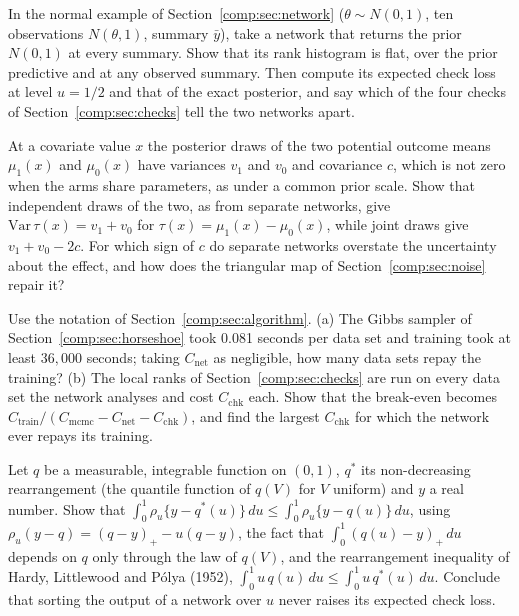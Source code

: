 \item\label{ex:chcomp:1} In the normal example of Section~\ref{comp:sec:network} ($\theta \sim N(0, 1)$, ten observations $N(\theta, 1)$, summary $\bar y$), take a network that returns the prior $N(0, 1)$ at every summary. Show that its rank histogram is flat, over the prior predictive and at any observed summary. Then compute its expected check loss at level $u = 1/2$ and that of the exact posterior, and say which of the four checks of Section~\ref{comp:sec:checks} tell the two networks apart.
\item\label{ex:chcomp:2} At a covariate value $x$ the posterior draws of the two potential outcome means $\mu_1(x)$ and $\mu_0(x)$ have variances $v_1$ and $v_0$ and covariance $c$, which is not zero when the arms share parameters, as under a common prior scale. Show that independent draws of the two, as from separate networks, give $\mathrm{Var}\,\tau(x) = v_1 + v_0$ for $\tau(x) = \mu_1(x) - \mu_0(x)$, while joint draws give $v_1 + v_0 - 2c$. For which sign of $c$ do separate networks overstate the uncertainty about the effect, and how does the triangular map of Section~\ref{comp:sec:noise} repair it?
\item\label{ex:chcomp:3} Use the notation of Section~\ref{comp:sec:algorithm}. (a) The Gibbs sampler of Section~\ref{comp:sec:horseshoe} took 0.081 seconds per data set and training took at least $36{,}000$ seconds; taking $C_{\mathrm{net}}$ as negligible, how many data sets repay the training? (b) The local ranks of Section~\ref{comp:sec:checks} are run on every data set the network analyses and cost $C_{\mathrm{chk}}$ each. Show that the break-even becomes $C_{\mathrm{train}}/(C_{\mathrm{mcmc}} - C_{\mathrm{net}} - C_{\mathrm{chk}})$, and find the largest $C_{\mathrm{chk}}$ for which the network ever repays its training.
\item\label{ex:chcomp:4} Let $q$ be a measurable, integrable function on $(0, 1)$, $q^\ast$ its non-decreasing rearrangement (the quantile function of $q(V)$ for $V$ uniform) and $y$ a real number. Show that $\int_0^1 \rho_u\{y - q^\ast(u)\}\,du \le \int_0^1 \rho_u\{y - q(u)\}\,du$, using $\rho_u(y - q) = (q - y)_+ - u(q - y)$, the fact that $\int_0^1 (q(u) - y)_+\,du$ depends on $q$ only through the law of $q(V)$, and the rearrangement inequality of Hardy, Littlewood and P\'olya (1952), $\int_0^1 u\,q(u)\,du \le \int_0^1 u\,q^\ast(u)\,du$. Conclude that sorting the output of a network over $u$ never raises its expected check loss.
